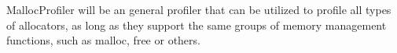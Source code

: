 
MallocProfiler will be an general profiler that can be utilized to profile all types of allocators, as long as they support the same groups of memory management functions, such as malloc, free or others. 

 